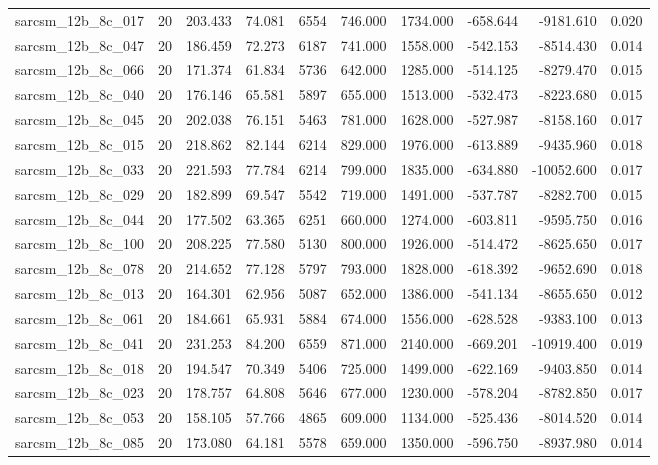 \begin{tabular}{lrrrrrrrrr}
sarcsm\_12b\_8c\_017 & 20 & 203.433 & 74.081 & 6554 & 746.000 & 1734.000 & -658.644 & -9181.610 & 0.020 \\
sarcsm\_12b\_8c\_047 & 20 & 186.459 & 72.273 & 6187 & 741.000 & 1558.000 & -542.153 & -8514.430 & 0.014 \\
sarcsm\_12b\_8c\_066 & 20 & 171.374 & 61.834 & 5736 & 642.000 & 1285.000 & -514.125 & -8279.470 & 0.015 \\
sarcsm\_12b\_8c\_040 & 20 & 176.146 & 65.581 & 5897 & 655.000 & 1513.000 & -532.473 & -8223.680 & 0.015 \\
sarcsm\_12b\_8c\_045 & 20 & 202.038 & 76.151 & 5463 & 781.000 & 1628.000 & -527.987 & -8158.160 & 0.017 \\
sarcsm\_12b\_8c\_015 & 20 & 218.862 & 82.144 & 6214 & 829.000 & 1976.000 & -613.889 & -9435.960 & 0.018 \\
sarcsm\_12b\_8c\_033 & 20 & 221.593 & 77.784 & 6214 & 799.000 & 1835.000 & -634.880 & -10052.600 & 0.017 \\
sarcsm\_12b\_8c\_029 & 20 & 182.899 & 69.547 & 5542 & 719.000 & 1491.000 & -537.787 & -8282.700 & 0.015 \\
sarcsm\_12b\_8c\_044 & 20 & 177.502 & 63.365 & 6251 & 660.000 & 1274.000 & -603.811 & -9595.750 & 0.016 \\
sarcsm\_12b\_8c\_100 & 20 & 208.225 & 77.580 & 5130 & 800.000 & 1926.000 & -514.472 & -8625.650 & 0.017 \\
sarcsm\_12b\_8c\_078 & 20 & 214.652 & 77.128 & 5797 & 793.000 & 1828.000 & -618.392 & -9652.690 & 0.018 \\
sarcsm\_12b\_8c\_013 & 20 & 164.301 & 62.956 & 5087 & 652.000 & 1386.000 & -541.134 & -8655.650 & 0.012 \\
sarcsm\_12b\_8c\_061 & 20 & 184.661 & 65.931 & 5884 & 674.000 & 1556.000 & -628.528 & -9383.100 & 0.013 \\
sarcsm\_12b\_8c\_041 & 20 & 231.253 & 84.200 & 6559 & 871.000 & 2140.000 & -669.201 & -10919.400 & 0.019 \\
sarcsm\_12b\_8c\_018 & 20 & 194.547 & 70.349 & 5406 & 725.000 & 1499.000 & -622.169 & -9403.850 & 0.014 \\
sarcsm\_12b\_8c\_023 & 20 & 178.757 & 64.808 & 5646 & 677.000 & 1230.000 & -578.204 & -8782.850 & 0.017 \\
sarcsm\_12b\_8c\_053 & 20 & 158.105 & 57.766 & 4865 & 609.000 & 1134.000 & -525.436 & -8014.520 & 0.014 \\
sarcsm\_12b\_8c\_085 & 20 & 173.080 & 64.181 & 5578 & 659.000 & 1350.000 & -596.750 & -8937.980 & 0.014 \\

\end{tabular}
